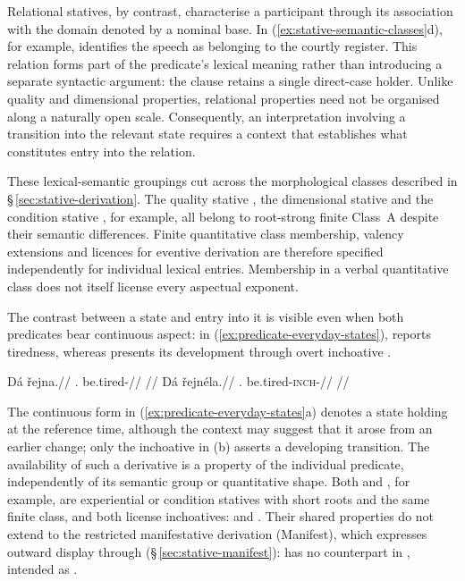 Relational statives, by contrast, characterise a participant through its
association with the domain denoted by a nominal base. In
(\ref{ex:stative-semantic-classes}d), for example,  identifies
the speech as belonging to the courtly register. This relation forms part of
the predicate's lexical meaning rather than introducing a separate syntactic
argument: the clause retains a single direct-case holder. Unlike quality and
dimensional properties, relational properties need not be organised along a
naturally open scale. Consequently, an interpretation involving a transition
into the relevant state requires a context that establishes what constitutes
entry into the relation.

These lexical-semantic groupings cut across the morphological classes
described in §\,\ref{sec:stative-derivation}. The quality stative ,
the dimensional stative  and the condition stative ,
for example, all belong to root-strong finite Class~A despite their semantic
differences. Finite quantitative class membership, valency extensions
and licences for eventive derivation are therefore specified independently
for individual lexical entries. Membership in a verbal quantitative class
does not itself license every aspectual exponent.

The contrast between a state and entry into it is visible even when both
predicates bear continuous aspect: in (\ref{ex:predicate-everyday-states}),
 reports tiredness, whereas  presents its
development through overt inchoative .

\pex\label{ex:predicate-everyday-states}
\a
\begingl
\gla Dá řejna.//
\Sg{}.\Dir{} be.tired-\Cont{}//
\glft {}
//
\endgl
\a
\begingl
\gla Dá řejnéla.//
\Sg{}.\Dir{} be.tired-\textsc{inch}-\Cont{}//
\glft {}
//
\endgl
\xe

The continuous form in (\ref{ex:predicate-everyday-states}a) denotes a state
holding at the reference time, although the context may suggest that it arose
from an earlier change; only the inchoative in (b) asserts a developing
transition. The availability of such a derivative is a property of the
individual predicate, independently of its semantic group or quantitative
shape. Both   and  ,
for example, are experiential or condition statives with short roots and the
same finite class, and both license inchoatives: 
 and  .
Their shared properties do not extend to the restricted manifestative
derivation (Manifest), which expresses outward display through 
(§\,\ref{sec:stative-manifest}): 
 has no counterpart in
, intended as .

